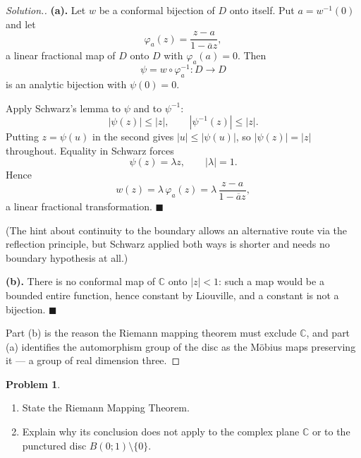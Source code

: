 \documentclass[11pt,a4paper]{article}
\theoremstyle{definition}
\newtheorem{problemx}{Problem}[section]
\newenvironment{problem}{\begin{problemx}}{\end{problemx}}
\newenvironment{solution}
  {\renewcommand{\qedsymbol}{}\begin{proof}[\textit{Solution}.]}
  {\end{proof}}
\begin{document}
\begin{solution}
\textbf{(a).} Let $w$ be a conformal bijection of $D$ onto itself. Put
$a = w^{-1}(0)$ and let
$$\varphi_a(z) = \frac{z-a}{1-\overline{a}z},$$
a linear fractional map of $D$ onto $D$ with $\varphi_a(a) = 0$. Then
$$\psi = w \circ \varphi_a^{-1} : D \rightarrow D$$
is an analytic bijection with $\psi(0) = 0$.

Apply Schwarz's lemma to $\psi$ and to $\psi^{-1}$:
$$\left|\psi(z)\right| \leq \left|z\right|,
\qquad \left|\psi^{-1}(z)\right| \leq \left|z\right| .$$
Putting $z = \psi(u)$ in the second gives $\left|u\right| \leq \left|\psi(u)\right|$,
so $\left|\psi(z)\right| = \left|z\right|$ throughout. Equality in Schwarz forces
$$\psi(z) = \lambda z, \qquad \left|\lambda\right| = 1 .$$
Hence
$$w(z) = \lambda\,\varphi_a(z) = \lambda\,\frac{z-a}{1-\overline{a}z},$$
a linear fractional transformation. $\blacksquare$

(The hint about continuity to the boundary allows an alternative route via the
reflection principle, but Schwarz applied both ways is shorter and needs no
boundary hypothesis at all.)

\textbf{(b).} There is no conformal map of $\mathbb{C}$ onto $\left|z\right| < 1$:
such a map would be a bounded entire function, hence constant by Liouville, and a
constant is not a bijection. $\blacksquare$

Part (b) is the reason the Riemann mapping theorem must exclude $\mathbb{C}$, and
part (a) identifies the automorphism group of the disc as the M\"obius maps
preserving it --- a group of real dimension three.
\end{solution}


\begin{problem}
\begin{enumerate}
\item[(a).] State the Riemann Mapping Theorem.
\item[(b).] Explain why its conclusion does not apply to the complex plane
$\mathbb{C}$ or to the punctured disc $B(0;1)\setminus\{0\}$.
\end{enumerate}
\end{problem}
\end{document}
